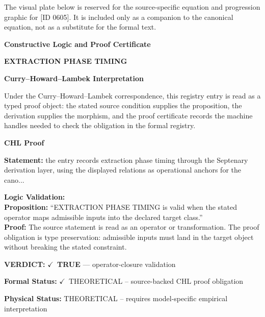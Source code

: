 \begingroup\footnotesize\sloppy
The visual plate below is reserved for the source-specific equation and progression graphic for [ID 0605]. It is included only as a companion to the canonical equation, not as a substitute for the formal text.
\par\endgroup
\ifTZPDarkEdition
{}
\fi

\clearpage
\begingroup\tzpsupportsetup
\noindent\textbf{\fontsize{10.8pt}{12.8pt}\selectfont [ID 0605] Constructive Logic and Proof Certificate}\par
\noindent\textbf{\fontsize{10pt}{12pt}\selectfont EXTRACTION PHASE TIMING}\par
\vspace{0.45em}
\begingroup
\footnotesize
\setlength{\parskip}{0.22em}
\setlength{\parindent}{0pt}
\noindent\textbf{Curry--Howard--Lambek Interpretation}\par
Under the Curry--Howard--Lambek correspondence, this registry entry is read as a typed proof
object: the stated source condition supplies the proposition, the derivation supplies the
morphism, and the proof certificate records the machine handles needed to check the obligation
in the formal registry.

\vspace{0.45em}
\noindent\textbf{CHL Proof}\par
\textbf{Statement:} the entry records extraction phase timing through the Septenary derivation layer, using
the displayed relations as operational anchors for the cano...

\textbf{Logic Validation:}\\
\textbf{Proposition:} ``EXTRACTION PHASE TIMING is valid when the stated operator maps admissible inputs into
the declared target class.''\\
\textbf{Proof:} The source statement is read as an operator or transformation. The proof obligation is
type preservation: admissible inputs must land in the target object without breaking the
stated constraint.

\textbf{VERDICT:} \ensuremath{\checkmark}\ \textbf{TRUE} --- operator-closure validation

\textbf{Formal Status:} \ensuremath{\checkmark}\ THEORETICAL -- source-backed CHL proof obligation

\textbf{Physical Status:} THEORETICAL -- requires model-specific empirical interpretation
\par\vspace{0.45em}
\par
\ifTZPDarkEdition
{}
\fi
\endgroup
\endgroup
